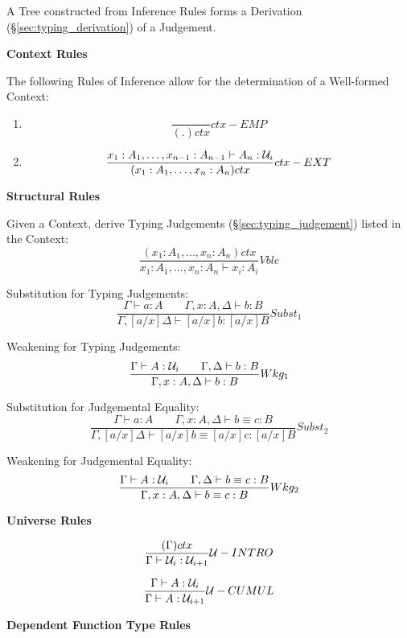 {A Tree constructed from Inference Rules forms a Derivation
(\S\ref{sec:typing_derivation}) of a Judgement.



\textbf{Context Rules}

The following Rules of Inference allow for the determination of a
Well-formed Context:
\begin{enumerate}
\item
\[
  {
    \frac{}{(.)ctx}
  } ctx-EMP
\]
\item
\[
  {
    \frac
    {x_1:A_1, \ldots, x_{n-1}:A_{n-1} \vdash A_n : \mathcal{U}_i}
    {(x_1:A_1,\ldots,x_n:A_n) ctx}
  } ctx-EXT
\]
\end{enumerate}



\textbf{Structural Rules}

Given a Context, derive Typing Judgements
(\S\ref{sec:typing_judgement}) listed in the Context:
\[
  {
    \frac
    {(x_1:A_1, \ldots, x_n:A_n)ctx}
    {x_1:A_1, \ldots, x_n:A_n \vdash x_i:A_i}
  } Vble
\]

Substitution for Typing Judgements:
\[
  {
    \frac
    {\Gamma \vdash a : A \;\;\;\;\;\;\;
    \Gamma,x:A,\Delta \vdash b : B}
    {\Gamma,[a/x]\Delta \vdash [a/x]b : [a/x]B}
  } Subst_1
\]

Weakening for Typing Judgements:
\[
  {
    \frac
    {\Gamma \vdash A : \mathcal{U}_i \;\;\;\;\;\;\;
    \Gamma,\Delta \vdash b : B}
    {\Gamma,x:A,\Delta \vdash b:B}
  } Wkg_1
\]

Substitution for Judgemental Equality:
\[
  {
    \frac
    {\Gamma \vdash a : A \;\;\;\;\;\;\;
    \Gamma,x:A,\Delta \vdash b \equiv c : B}
    {\Gamma,[a/x]\Delta \vdash [a/x]b \equiv [a/x]c : [a/x]B}
  } Subst_2
\]

Weakening for Judgemental Equality:
\[
  {
    \frac
    {\Gamma \vdash A : \mathcal{U}_i \;\;\;\;\;\;\;
    \Gamma,\Delta \vdash b \equiv c : B}
    {\Gamma, x:A, \Delta \vdash b \equiv c : B}
  } Wkg_2
\]



\textbf{Universe Rules}

\[
  {
    \frac
    {(\Gamma) ctx}
    {\Gamma \vdash \mathcal{U}_i : \mathcal{U}_{i+1}}
  } \mathcal{U}-INTRO
\]

\[
  {
    \frac
    {\Gamma \vdash A : \mathcal{U}_i}
    {\Gamma \vdash A : \mathcal{U}_{i+1}}
  } \mathcal{U}-CUMUL
\]



\textbf{Dependent Function Type Rules}

}
